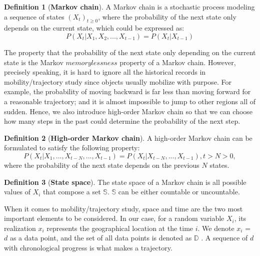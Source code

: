 \documentclass[12pt]{article}
\theoremstyle{definition}
\newtheorem{definition}{Definition}[section]
\begin{document}
\begin{definition}[\textbf{Markov chain}]
  \label{def:markov_chain}
  A Markov chain is a stochastic process modeling a sequence of states \((X_{t})_{t \geq 0}\), where the probability of the next state only depends on the current state, which could be expressed as:\\
  \begin{equation*} 
  P(X_{t}|X_{1},X_{2},...,X_{t-1}) = P(X_{t}|X_{t-1}) 
  \end{equation*}
\end{definition}

The property that the probability of the next state only depending on the current state is the Markov \(memorylessness\) property of a Markov chain. However, precisely speaking, it is hard to ignore all the historical records in mobility/trajectory study since objects usually mobilize with purpose. For example, the probability of moving backward is far less than moving forward for a reasonable trajectory; and it is almost impossible to jump to other regions all of sudden. Hence, we also introduce high-order Markov chain so that we can choose how many steps in the past could determine the probability of the next step.

\begin{definition}[\textbf{High-order Markov chain}]
  \label{def:markov_chain}
  A high-order Markov chain can be formulated to satisfy the following property:\\
  \begin{equation*} 
  P(X_{t}|X_{1},...,X_{t-N},...,X_{t-1}) = P(X_{t}|X_{t-N},...,X_{t-1}), t>N>0,
  \end{equation*} where the probability of the next state depends on the previous \(N\) states.
\end{definition}

\begin{definition}[\textbf{State space}]
  \label{def:state_space}
  The state space of a Markov chain is all possible values of \(X_i\) that compose a set \(\mathbb{S}\). \(\mathbb{S}\) can be either countable or uncountable.
\end{definition}

When it comes to mobility/trajectory study, space and time are the two most important elements to be considered. In our case, for a random variable \(X_i\), its realization \(x_i\) represents the geographical location at the time \(i\). We denote \(x_i\) = \(d\) as a data point, and the set of all data points is denoted as \(\mathbb{D}\) \cite{privacy_traj_co-traj_2019}. A sequence of \(d\) with chronological progress is what makes a trajectory. 
\end{document}
